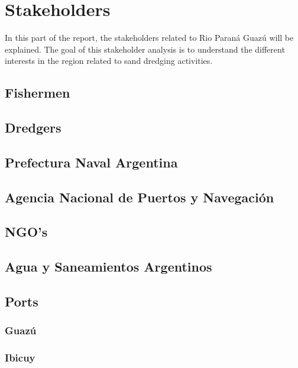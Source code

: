 \chapter{Stakeholders}
\label{chapter:stakeholders}

In this part of the report, the stakeholders related to Rio Paraná Guazú will be explained. The goal of this stakeholder analysis is to understand the different interests in the region related to sand dredging activities.

\section{Fishermen}


\section{Dredgers}


\section{Prefectura Naval Argentina}


\section{Agencia Nacional de Puertos y Navegación}


\section{NGO's}


\section{Agua y Saneamientos Argentinos}


\section{Ports}

\subsection{Guazú}

\subsection{Ibicuy}